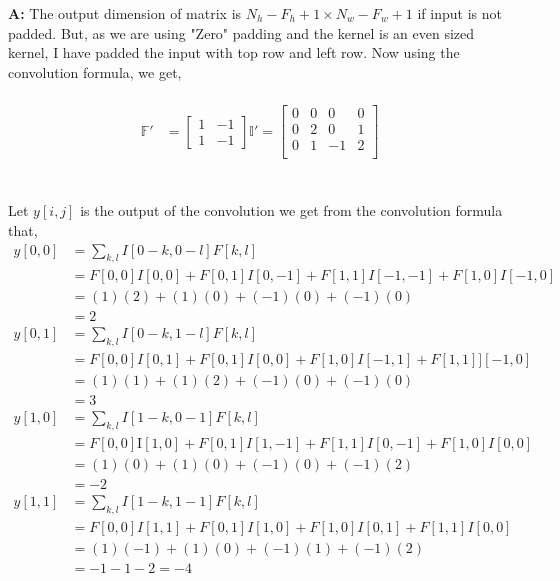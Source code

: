 \documentclass[english,a4paper,12pt]{article}
\begin{document}
\begin{enumerate}
{\textbf{A:} The output dimension of matrix is $N_h-F_h+1 \times N_w-F_w+1$ if input is not padded. But, as we are using "Zero" padding and the kernel is an even sized kernel, I have padded the input with top row and left row. Now using the convolution formula, we get, \\~\\
\begin{align*}
\mathbb{F'} & = \begin{bmatrix}
1 & -1 \\
1 & -1
\end{bmatrix} 
\mathbb{I'} = \begin{bmatrix}
0 & 0 & 0 & 0 \\
0 & 2 & 0 & 1  \\
0 & 1 & -1 & 2 \\
\end{bmatrix}
\end{align*} \\~\\
Let $ y[i,j]$ is the output of the convolution we get from the convolution formula that, \\ 
$$
\begin{aligned}
y[0,0] &=\sum_{k, l} I[0-k, 0-l] F[k,l] \\
&=F[0,0] I[0,0]+F[0,1] I[0, -1]+F[1,1] I[-1,-1]+F[1,0] I[-1,0] \\
&=(1)(2)+(1)(0)+(-1)(0)+(-1)(0) \\
&=2
\end{aligned}
$$
$$
\begin{aligned}
y[0,1] &=\sum_{k, l} I[0-k, 1-l] F[k, l] \\
&=F[0,0] I[0,1]+F[0,1] I[0,0]+F[1,0] I[-1,1]+F[1,1]][-1,0]\\
&=(1)(1)+(1)(2)+(-1)(0)+(-1)(0) \\
&=3
\end{aligned}
$$
$$
\begin{aligned}
y[1,0] &=\sum_{k, l} I[1-k, 0-1] F[k, l] \\
&=F[0,0] \mathrm{I}[1,0]+F[0,1] I[1,-1]+F[1,1] I[0,-1]+F[1,0] I[0,0] \\
&=(1)(0)+(1)(0)+(-1)(0)+(-1)(2)\\
&=-2
\end{aligned}
$$
$$
\begin{aligned}
y[1,1] &=\sum_{k, l} I[1-k, 1-1] F[k, l] \\
&=F[0,0] I[1,1]+F[0,1] I[1,0]+F[1,0] I[0,1]+F[1,1] I[0,0] \\
&=(1)(-1)+(1)(0)+(-1)(1)+(-1)(2) \\
&=-1-1-2=-4
\end{aligned}
$$

}
\end{enumerate}
\end{document}

